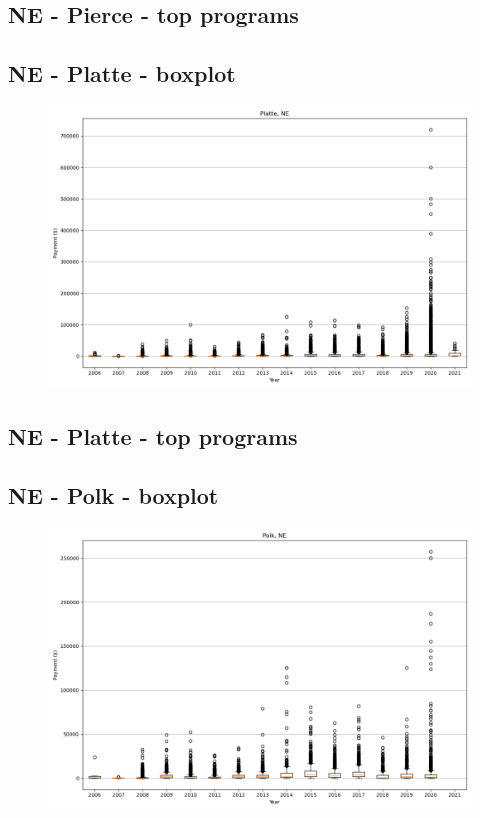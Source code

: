 \subsection*{NE - Pierce - top programs}

\newpage
\subsection*{NE - Platte - boxplot}
\begin{figure}[h]
\centering
\includegraphics[width=7in]{../output/boxplots/counties/Platte-NE_boxplot.png}
\end{figure}


\subsection*{NE - Platte - top programs}

\newpage
\subsection*{NE - Polk - boxplot}
\begin{figure}[h]
\centering
\includegraphics[width=7in]{../output/boxplots/counties/Polk-NE_boxplot.png}
\end{figure}


